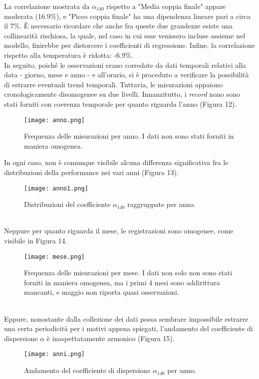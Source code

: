 \documentclass[fleqn,10pt]{SelfArx} %
\begin{document}
La correlazione mostrata da $\alpha_{140}$ rispetto a "Media coppia finale" appare moderata (16.9\%), e "Picco coppia finale" ha una dipendenza lineare pari a circa il 7\%. È necessario ricordare che anche fra queste due grandezze esiste una collinearità rischiosa, la quale, nel caso in cui esse venissero incluse assieme nel modello, finirebbe per distorcere i coefficienti di regressione. Infine, la correlazione rispetto alla temperatura è ridotta: -6.9\%.\\
In seguito, poiché le osservazioni erano corredate da dati temporali relativi alla data - giorno, mese e anno - e all'orario, si è proceduto a verificare la possibilità di estrarre eventuali trend temporali. Tuttavia, le misurazioni appaiono cronologicamente disomogenee su due livelli. Innanzitutto, i \textit{record} nono sono stati forniti con coerenza temporale per quanto riguarda l'anno (Figura 12). 
\begin{figure}[h]
    \centering
    \texttt{[image: anno.png]}
    \label{fig:em}
    \caption{Frequenza delle misurazioni per anno. I dati non sono stati forniti in maniera omogenea.}
\end{figure}
In ogni caso, non è comunque visibile alcuna differenza significativa fra le distribuzioni della performance nei vari anni (Figura 13).
\begin{figure}[h]
    \centering
    \texttt{[image: anno1.png]}
    \label{fig:em}
    \caption{Distribuzioni del coefficiente $\alpha_{140}$ raggruppate per anno.}
\end{figure}
\\
Neppure per quanto riguarda il mese, le registrazioni sono omogenee, come visibile in Figura 14.
\begin{figure}[h]
    \centering
    \texttt{[image: mese.png]}
    \label{fig:em}
    \caption{Frequenza delle misurazioni per mese. I dati non solo non sono stati forniti in maniera omogenea, ma i primi 4 mesi sono addirittura mancanti, e maggio non riporta quasi osservazioni.}
\end{figure}
\\
Eppure, nonostante dalla collezione dei dati possa sembrare impossibile estrarre una certa periodicità per i motivi appena spiegati, l'andamento del coefficiente di dispersione $\alpha$ è inaspettatamente armonico (Figura 15).
\begin{figure}[h]
    \centering
    \texttt{[image: anni.png]}
    \label{fig:em}
    \caption{Andamento del coefficiente di dispersione $\alpha_{140}$ per anno.}
\end{figure}
\end{document}
